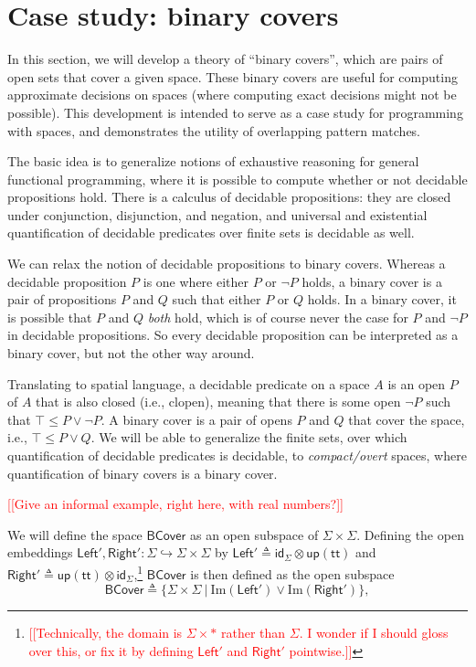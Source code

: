 \documentclass[conference]{IEEEtran}
\newcommand{\hookto}{\hookrightarrow}
\newcommand{\suchthat}{\ |\ }
\newcommand{\One}{\ast}
\newcommand{\Img}[1]{\text{Im}\left({#1}\right)}
\newcommand{\strue}{\mathsf{up}(\mathsf{tt})}
\newcommand{\BCover}{\mathsf{BCover}}
\newcommand{\note}[1]{\textcolor{red}{[[{#1}]]}}
\begin{document}
\section{Case study: binary covers}
\label{s:bcover}

In this section, we will develop a theory of ``binary covers'', which are pairs of open sets that cover a given space. These binary covers are useful for computing approximate decisions on spaces (where computing exact decisions might not be possible). This development is intended to serve as a case study for programming with spaces, and demonstrates the utility of overlapping pattern matches.

The basic idea is to generalize notions of exhaustive reasoning for general functional programming, where it is possible to compute whether or not decidable propositions hold. There is a calculus of decidable propositions: they are closed under conjunction, disjunction, and negation, and universal and existential quantification of decidable predicates over finite sets is decidable as well.

We can relax the notion of decidable propositions to binary covers. Whereas a decidable proposition $P$ is one where either $P$ or $\neg P$ holds, a binary cover is a pair of propositions $P$ and $Q$ such that either $P$ or $Q$ holds. In a binary cover, it is possible that $P$ and $Q$ \emph{both} hold, which is of course never the case for $P$ and $\neg P$ in decidable propositions. So every decidable proposition can be interpreted as a binary cover, but not the other way around.

Translating to spatial language, a decidable predicate on a space $A$ is an open $P$ of $A$ that is also closed (i.e., clopen), meaning that there is some open $\neg P$ such that $\top \le P \vee \neg P$. A binary cover is a pair of opens $P$ and $Q$ that cover the space, i.e., $\top \le P \vee Q$. We will be able to generalize the finite sets, over which quantification of decidable predicates is decidable, to \emph{compact/overt} spaces, where quantification of binary covers is a binary cover.

\note{Give an informal example, right here, with real numbers?}

We will define the space $\BCover$ as an open subspace of $\Sigma \times \Sigma$. Defining the open embeddings $\mathsf{Left}', \mathsf{Right}' : \Sigma \hookto \Sigma \times \Sigma$ by 
$\mathsf{Left}' \triangleq \mathsf{id}_\Sigma \otimes \strue$ and
$\mathsf{Right}' \triangleq \strue \otimes \mathsf{id}_\Sigma$,\footnote{\note{Technically, the domain is $\Sigma \times \One$ rather than $\Sigma$. I wonder if I should gloss over this, or fix it by defining $\mathsf{Left}'$ and $\mathsf{Right}'$ pointwise.}}
$\BCover$ is then defined as the open subspace
\[
\BCover \triangleq \{ \Sigma \times \Sigma \suchthat \Img{\mathsf{Left}'} \vee \Img{\mathsf{Right}'} \},
\]
\end{document}

